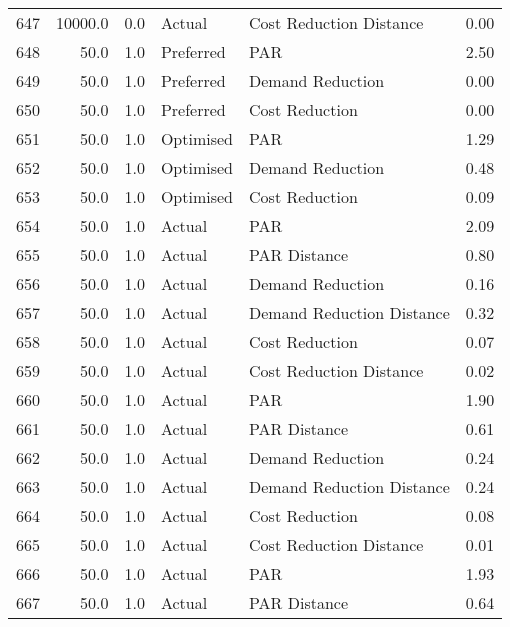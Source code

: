 \begin{longtable}{lrrllr}
647  &      10000.0 &     0.0 &         Actual &    Cost Reduction Distance &   0.00 \\
648  &         50.0 &     1.0 &      Preferred &                        PAR &   2.50 \\
649  &         50.0 &     1.0 &      Preferred &           Demand Reduction &   0.00 \\
650  &         50.0 &     1.0 &      Preferred &             Cost Reduction &   0.00 \\
651  &         50.0 &     1.0 &      Optimised &                        PAR &   1.29 \\
652  &         50.0 &     1.0 &      Optimised &           Demand Reduction &   0.48 \\
653  &         50.0 &     1.0 &      Optimised &             Cost Reduction &   0.09 \\
654  &         50.0 &     1.0 &         Actual &                        PAR &   2.09 \\
655  &         50.0 &     1.0 &         Actual &               PAR Distance &   0.80 \\
656  &         50.0 &     1.0 &         Actual &           Demand Reduction &   0.16 \\
657  &         50.0 &     1.0 &         Actual &  Demand Reduction Distance &   0.32 \\
658  &         50.0 &     1.0 &         Actual &             Cost Reduction &   0.07 \\
659  &         50.0 &     1.0 &         Actual &    Cost Reduction Distance &   0.02 \\
660  &         50.0 &     1.0 &         Actual &                        PAR &   1.90 \\
661  &         50.0 &     1.0 &         Actual &               PAR Distance &   0.61 \\
662  &         50.0 &     1.0 &         Actual &           Demand Reduction &   0.24 \\
663  &         50.0 &     1.0 &         Actual &  Demand Reduction Distance &   0.24 \\
664  &         50.0 &     1.0 &         Actual &             Cost Reduction &   0.08 \\
665  &         50.0 &     1.0 &         Actual &    Cost Reduction Distance &   0.01 \\
666  &         50.0 &     1.0 &         Actual &                        PAR &   1.93 \\
667  &         50.0 &     1.0 &         Actual &               PAR Distance &   0.64 \\

\end{longtable}
